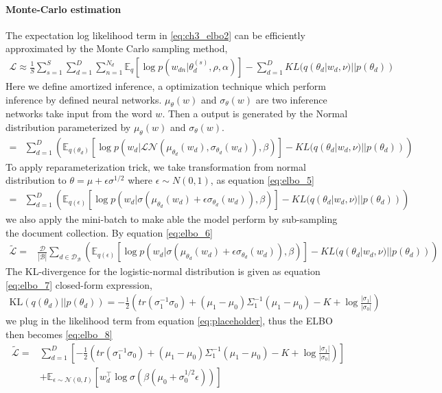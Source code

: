 \paragraph{Monte-Carlo estimation}
The expectation log likelihood term in \ref{eq:ch3_elbo2} can be efficiently approximated by the Monte Carlo sampling method,
\begin{align}\label{eq:ch3_elbo2}
\mathcal{L}\approx\frac{1}{S}\sum_{s=1}^{S}\sum_{d=1}^{D}\sum_{n=1}^{N_d}\mathbb{E}_q[\log p(w_{dn}|\theta_d^{(s)},\rho,\alpha)]-\sum_{d=1}^{D}KL(q(\theta_d|w_d,\nu)||p(\theta_d))
\end{align}
Here we define amortized inference, a optimization technique which perform inference by defined neural networks. $ \mu_\theta(w) $ and $ \sigma_\theta(w) $ are two inference networks take input from the word $ w $. Then a output is generated by the Normal distribution parameterized by $ \mu_\theta(w) $ and $ \sigma_\theta(w) $.
\begin{align}\label{eq:ch3_elbo3}
=&\sum_{d=1}^{D}\left(\mathbb{E}_{q(\theta_d)}\left[\log p(w_d|\mathcal{LN}(\mu_{\theta_d}(w_d),\sigma_{\theta_d}(w_d)),\beta)\right]-KL(q(\theta_d|w_d,\nu)||p(\theta_d))\right)
\end{align}
To apply reparameterization trick, we take transformation from normal distribution to $ \theta=\mu+\epsilon\sigma^{1/2} $ where $ \epsilon\sim N(0,1) $, as  equation \ref{eq:elbo_5}
\begin{align}\label{eq:elbo_5}
=&\sum_{d=1}^{D}\left(\mathbb{E}_{q(\epsilon)}\left[\log p(w_d|\sigma(\mu_{\theta_d}(w_d)+\epsilon\sigma_{\theta_d}(w_d)),\beta)\right]-KL(q(\theta_d|w_d,\nu)||p(\theta_d))\right)
\end{align}
we also apply the mini-batch to make able the model perform by sub-sampling the document collection. By equation \ref{eq:elbo_6}
\begin{align}\label{eq:elbo_6}
\tilde{\mathcal{L}}=&\frac{\mathcal{D}}{|\mathcal{B}|}\sum_{d\in\mathcal{D_B}}\left(\mathbb{E}_{q(\epsilon)}\left[\log p(w_d|\sigma(\mu_{\theta_d}(w_d)+\epsilon\sigma_{\theta_d}(w_d)),\beta)\right]-KL(q(\theta_d|w_d,\nu)||p(\theta_d))\right)
\end{align}
The KL-divergence for the logistic-normal distribution is given as equation \ref{eq:elbo_7} closed-form expression,
\begin{align}\label{eq:elbo_7}
\text{KL}(q(\theta_d)||p(\theta_d))=-\frac{1}{2}\left(tr(\sigma_1^{-1}\sigma_0)+(\mu_1-\mu_0)\Sigma_1^{-1}(\mu_1-\mu_0)-K+\log\frac{|\sigma_1|}{|\sigma_0|}\right)
\end{align}
we plug in the likelihood term from equation \ref{eq:placeholder}, thus the ELBO then becomes \ref{eq:elbo_8}
\begin{align}\label{eq:elbo_8}
\tilde{\mathcal{L}}=&\sum_{d=1}^{D}\left[-\frac{1}{2}\left(tr(\sigma_1^{-1}\sigma_0)+(\mu_1-\mu_0)\Sigma_1^{-1}(\mu_1-\mu_0)-K+\log\frac{|\sigma_1|}{|\sigma_0|}\right)\right]\\
&+\mathbb{E}_{\epsilon\sim\mathcal{N}(0,I)}\left[w_d^\top\log\sigma(\beta(\mu_0+\sigma_0^{1/2}\epsilon))\right]
\end{align}
